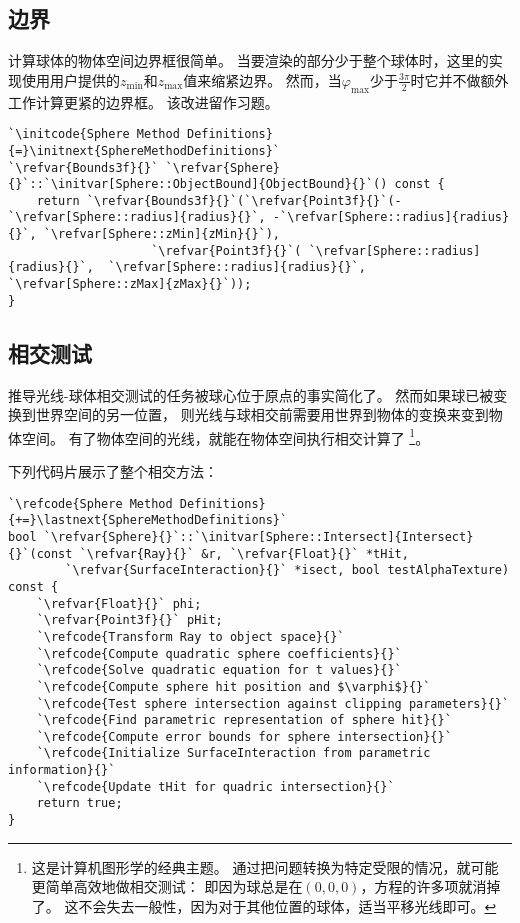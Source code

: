 \subsection{边界}\label{sub:边界2}
计算球体的物体空间边界框很简单。
当要渲染的部分少于整个球体时，这里的实现使用用户提供的$z_{\min}$和$z_{\max}$值来缩紧边界。
然而，当$\varphi_{\max}$少于$\displaystyle\frac{3\pi}{2}$时它并不做额外工作计算更紧的边界框。
该改进留作习题。
\begin{lstlisting}
`\initcode{Sphere Method Definitions}{=}\initnext{SphereMethodDefinitions}`
`\refvar{Bounds3f}{}` `\refvar{Sphere}{}`::`\initvar[Sphere::ObjectBound]{ObjectBound}{}`() const {
    return `\refvar{Bounds3f}{}`(`\refvar{Point3f}{}`(-`\refvar[Sphere::radius]{radius}{}`, -`\refvar[Sphere::radius]{radius}{}`, `\refvar[Sphere::zMin]{zMin}{}`),
                    `\refvar{Point3f}{}`( `\refvar[Sphere::radius]{radius}{}`,  `\refvar[Sphere::radius]{radius}{}`, `\refvar[Sphere::zMax]{zMax}{}`));
}
\end{lstlisting}

\subsection{相交测试}\label{sub:相交测试2}
推导光线-球体相交测试的任务被球心位于原点的事实简化了。
然而如果球已被变换到世界空间的另一位置，
则光线与球相交前需要用世界到物体的变换来变到物体空间。
有了物体空间的光线，就能在物体空间执行相交计算了
\footnote{这是计算机图形学的经典主题。
    通过把问题转换为特定受限的情况，就可能更简单高效地做相交测试：
    即因为球总是在$(0,0,0)$，方程的许多项就消掉了。
    这不会失去一般性，因为对于其他位置的球体，适当平移光线即可。}。

下列代码片展示了整个相交方法：
\begin{lstlisting}
`\refcode{Sphere Method Definitions}{+=}\lastnext{SphereMethodDefinitions}`
bool `\refvar{Sphere}{}`::`\initvar[Sphere::Intersect]{Intersect}{}`(const `\refvar{Ray}{}` &r, `\refvar{Float}{}` *tHit,
        `\refvar{SurfaceInteraction}{}` *isect, bool testAlphaTexture) const {
    `\refvar{Float}{}` phi;
    `\refvar{Point3f}{}` pHit;
    `\refcode{Transform Ray to object space}{}`
    `\refcode{Compute quadratic sphere coefficients}{}`
    `\refcode{Solve quadratic equation for t values}{}`
    `\refcode{Compute sphere hit position and $\varphi$}{}`
    `\refcode{Test sphere intersection against clipping parameters}{}`
    `\refcode{Find parametric representation of sphere hit}{}`
    `\refcode{Compute error bounds for sphere intersection}{}`
    `\refcode{Initialize SurfaceInteraction from parametric information}{}`
    `\refcode{Update tHit for quadric intersection}{}`
    return true;
}
\end{lstlisting}

